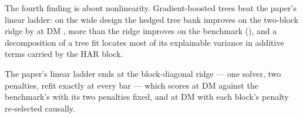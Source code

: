 The fourth finding is about nonlinearity. Gradient-boosted trees beat
the paper's linear ladder: on the wide design the hedged tree bank improves
on the two-block ridge by \unifTreeBankHedgeVsBlkTwoDQ{} at DM
\unifTreeBankHedgeVsBlkTwoDM{}, more than the ridge improves on the benchmark
(\unifBlkTwoUserDelta{}), and a decomposition of a tree fit locates most of its
explainable variance in additive terms carried by the HAR block.

The paper's linear ladder ends at the block-diagonal ridge --- one solver,
two penalties, refit exactly at every bar --- which scores
\unifBlkTwoUserQLIKE{} at DM \unifBlkTwoUserDM{} against the
benchmark's \unifAzeroQLIKE{} with its two penalties fixed, and
\unifBlkTwoTunedQLIKE{} at DM \unifBlkTwoTunedDM{} with each block's penalty
re-selected causally.
